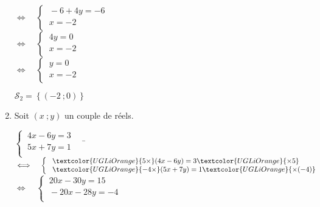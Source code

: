 \documentclass[a4paper,11pt,exos]{nsi} %
\begin{document}
\begin{enumerate}
\begin{tabbing}
            \>  $\iff\quad \left\{
                \begin{array}{l}
                \ -6+4y=-6 \\
                \ x=-2\\
            \end{array} \right.$\\[.5em]

            \>  $\iff\quad \left\{
                \begin{array}{l}
                \ 4y=0 \\
                \ x=-2\\
            \end{array} \right.$\\[.5em]

            \>  $\iff\quad \left\{
                \begin{array}{l}
                \ y=0\\
                \ x=-2\\
            \end{array} \right.$
        \end{tabbing}
        $\mathcal{S}_2=\left\{\left(-2\ ;0\right)\right\}$

    \item Soit $(x\ ;y)$ un couple de réels.
    \begin{tabbing}
        $\left\{
            \begin{array}{l}
                \ 4x-6y=3 \\
				\ 5x+7y=1\\
            \end{array} \right. \quad$  \= $\iff\quad 
            \left\{
                \begin{array}{l}
                \ \textcolor{UGLiOrange}{5\times}(4x-6y)=3\textcolor{UGLiOrange}{\times5} \\
				\ \textcolor{UGLiOrange}{-4\times}(5x+7y)=1\textcolor{UGLiOrange}{\times (-4)}\\
            \end{array} \right.$\\[.5em]

            \>  $\iff\quad \left\{
                \begin{array}{l}
                \ 20x-30y=15 \\
                \ -20x-28y=-4\\
            \end{array} \right.$\\[.5em]


\end{tabbing}
\end{enumerate}
\end{document}
